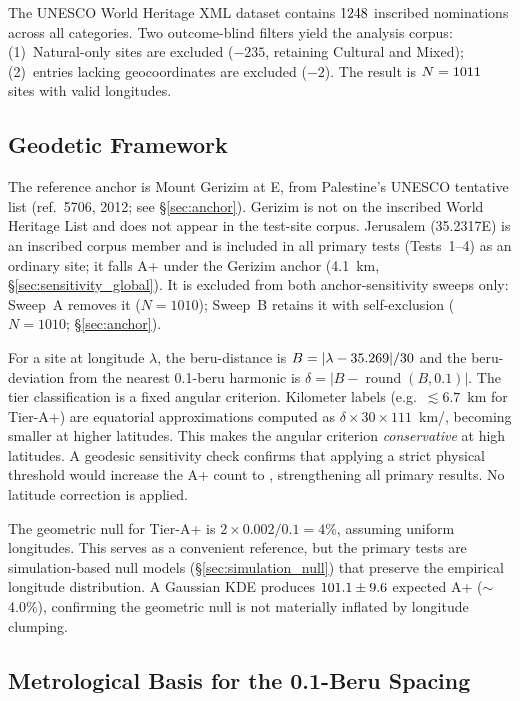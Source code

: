 \documentclass[HARVARD,twocolumn]{USG}
\begin{document}
The UNESCO World Heritage XML dataset contains $1248$ inscribed
nominations across all categories. Two outcome-blind filters yield the
analysis corpus: (1)~Natural-only sites are excluded ($-235$, retaining
Cultural and Mixed); (2)~entries lacking geocoordinates are excluded ($-2$).
The result is $N = 1011$ sites with valid longitudes.

\subsection{Geodetic Framework}

The reference anchor is Mount Gerizim at \GerizimLon\textdegree{}E,
from Palestine's UNESCO tentative list (ref.~5706, 2012; see \S\ref{sec:anchor}).
Gerizim is not on the inscribed World Heritage List and does not appear
in the test-site corpus. Jerusalem (35.2317\textdegree{}E) is an inscribed
corpus member and is included in all primary tests (Tests~1--4) as an
ordinary site; it falls A+ under the Gerizim anchor (4.1~km,
\S\ref{sec:sensitivity_global}). It is excluded from both
anchor-sensitivity sweeps only: Sweep~A removes it ($N = 1010$);
Sweep~B retains it with self-exclusion ($N = 1010$;
\S\ref{sec:anchor}).

For a site at longitude $\lambda$, the beru-distance is
$B = |\lambda - 35.269| / 30$ and the beru-deviation from the
nearest 0.1-beru harmonic is
$\delta = |B - \operatorname{round}(B, 0.1)|$.
The tier classification is a fixed angular criterion.
Kilometer labels (e.g.\ $\lesssim 6.7$~km for Tier-A+) are equatorial
approximations computed as $\delta \times 30 \times 111$~km/\textdegree{},
becoming smaller at higher latitudes. This makes the angular criterion
\emph{conservative} at high latitudes. A geodesic sensitivity check confirms
that applying a strict physical threshold would increase the A+ count to
\GeodesicApPhysical{}, strengthening all primary results. No latitude
correction is applied.

The geometric null for Tier-A+ is $2 \times 0.002 / 0.1 = 4\%$,
assuming uniform longitudes. This serves as a convenient reference, but
the primary tests are simulation-based null models (\S\ref{sec:simulation_null})
that preserve the empirical longitude distribution. A Gaussian KDE produces
$101.1 \pm 9.6$ expected A+ ($\sim$4.0\%), confirming the
geometric null is not materially inflated by longitude clumping.

\subsection{Metrological Basis for the 0.1-Beru Spacing}
\label{sec:metrology_basis}
\end{document}
